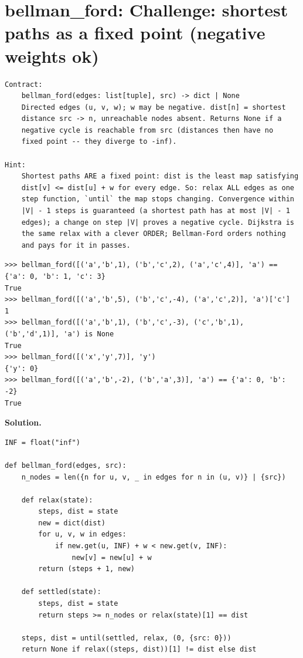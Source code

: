 \documentclass[10pt,letterpaper]{book}
\begin{document}
\section{bellman\_ford: Challenge: shortest paths as a fixed point (negative weights ok)}
\begin{lstlisting}[style=ex]
Contract:
    bellman_ford(edges: list[tuple], src) -> dict | None
    Directed edges (u, v, w); w may be negative. dist[n] = shortest
    distance src -> n, unreachable nodes absent. Returns None if a
    negative cycle is reachable from src (distances then have no
    fixed point -- they diverge to -inf).

Hint:
    Shortest paths ARE a fixed point: dist is the least map satisfying
    dist[v] <= dist[u] + w for every edge. So: relax ALL edges as one
    step function, `until` the map stops changing. Convergence within
    |V| - 1 steps is guaranteed (a shortest path has at most |V| - 1
    edges); a change on step |V| proves a negative cycle. Dijkstra is
    the same relax with a clever ORDER; Bellman-Ford orders nothing
    and pays for it in passes.
\end{lstlisting}
\begin{lstlisting}[style=ex]
>>> bellman_ford([('a','b',1), ('b','c',2), ('a','c',4)], 'a') == {'a': 0, 'b': 1, 'c': 3}
True
>>> bellman_ford([('a','b',5), ('b','c',-4), ('a','c',2)], 'a')['c']
1
>>> bellman_ford([('a','b',1), ('b','c',-3), ('c','b',1), ('b','d',1)], 'a') is None
True
>>> bellman_ford([('x','y',7)], 'y')
{'y': 0}
>>> bellman_ford([('a','b',-2), ('b','a',3)], 'a') == {'a': 0, 'b': -2}
True
\end{lstlisting}
\noindent\textbf{Solution.}
\begin{lstlisting}[style=code]
INF = float("inf")

def bellman_ford(edges, src):
    n_nodes = len({n for u, v, _ in edges for n in (u, v)} | {src})

    def relax(state):
        steps, dist = state
        new = dict(dist)
        for u, v, w in edges:
            if new.get(u, INF) + w < new.get(v, INF):
                new[v] = new[u] + w
        return (steps + 1, new)

    def settled(state):
        steps, dist = state
        return steps >= n_nodes or relax(state)[1] == dist

    steps, dist = until(settled, relax, (0, {src: 0}))
    return None if relax((steps, dist))[1] != dist else dist
\end{lstlisting}
\end{document}
